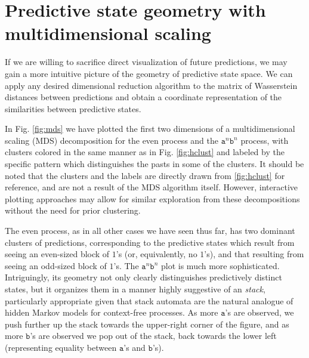 \documentclass[sigconf, anonymous, review]{acmart}
\begin{document}
\section{Predictive state geometry with multidimensional scaling}
If we are willing to sacrifice direct visualization of future predictions, we
may gain a more intuitive picture of the geometry of predictive state space. We
can apply any desired dimensional reduction algorithm to the matrix of
Wasserstein distances between predictions and obtain a coordinate representation
of the similarities between predictive states.

In Fig. \ref{fig:mds} we have plotted the first two dimensions of a
multidimensional scaling (MDS) decomposition \cite{Borg05a} for the even process
and the $\mathtt{a}^n\mathtt{b}^n$ process, with clusters colored in the same
manner as in Fig. \ref{fig:hclust} and labeled by the specific pattern which
distinguishes the pasts in some of the clusters. It should be noted that the
clusters and the labels are directly drawn from \ref{fig:hclust} for reference,
and are not a result of the MDS algorithm itself. However, interactive plotting
approaches may allow for similar exploration from these decompositions without
the need for prior clustering.

The even process, as in all other cases we have seen thus far, has two dominant
clusters of predictions, corresponding to the predictive states which result
from seeing an even-sized block of $1$'s (or, equivalently, no $1$'s), and that
resulting from seeing an odd-sized block of $1$'s. The
$\mathtt{a}^n\mathtt{b}^n$ plot is much more sophisticated. Intriguingly, its
geometry not only clearly distinguishes predictively distinct states, but it
organizes them in a manner highly suggestive of an \emph{stack}, particularly
appropriate given that stack automata are the natural analogue of hidden Markov
models for context-free processes. As more $\mathtt{a}$'s are observed, we push
further up the stack towards the upper-right corner of the figure, and as more
$\mathtt{b}$'s are observed we pop out of the stack, back towards the lower left
(representing equality between $\mathtt{a}$'s and $\mathtt{b}$'s).
\end{document}
